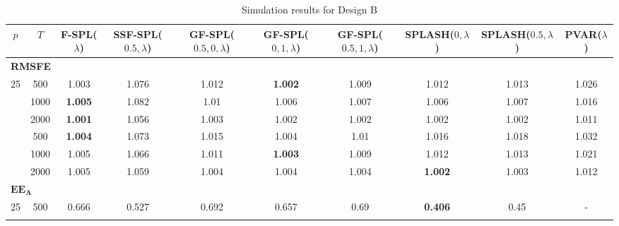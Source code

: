 \begin{landscape}
    \bgroup
    \def\arraystretch{1.3}
    \begin{table}[p]
    \footnotesize
    \centering
    \caption{Simulation results for Design B}
    \label{tab:results_designB}
    \begin{tabular}{cccccccccc}    
    \hline \hline
    $p$  &  $T$   &  F-SPL($\lambda$)  & SSF-SPL($0.5, \lambda$)  &  GF-SPL($0.5, 0, \lambda$)  &  GF-SPL($0, 1, \lambda$)  &  GF-SPL($0.5, 1, \lambda$)  &  SPLASH($0, \lambda$)  &  SPLASH($0.5, \lambda$)  &  PVAR($\lambda$)  \\
    \hline
    \multicolumn{10}{l}{\textbf{RMSFE}} \\
	\hline
	 25  & 500  & 1.003              &           1.076           &            1.012            & \textbf{1.002}            &            1.009            & 1.012                  &          1.013           &       1.026       \\ \hdashline
	 25  & 1000 & \textbf{1.005}     &           1.082           &            1.01             & 1.006                     &            1.007            & 1.006                  &          1.007           &       1.016       \\ \hdashline
	 25  & 2000 & \textbf{1.001}     &           1.056           &            1.003            & 1.002                     &            1.002            & 1.002                  &          1.002           &       1.011       \\ \hdashline
	 36  & 500  & \textbf{1.004}     &           1.073           &            1.015            & 1.004                     &            1.01             & 1.016                  &          1.018           &       1.032       \\ \hdashline
	 36  & 1000 & 1.005              &           1.066           &            1.011            & \textbf{1.003}            &            1.009            & 1.012                  &          1.013           &       1.021       \\ \hdashline
	 36  & 2000 & 1.005              &           1.059           &            1.004            & 1.004                     &            1.004            & \textbf{1.002}         &          1.003           &       1.012       \\
	\hline
	\multicolumn{10}{l}{$\mathbf{EE_A}$} \\
	\hline
	 25  & 500  &       0.666        &           0.527           &            0.692            &           0.657           &            0.69             & \textbf{0.406}         &           0.45           & -                 \\ \hdashline

\end{tabular}
\end{table}
\end{landscape}
